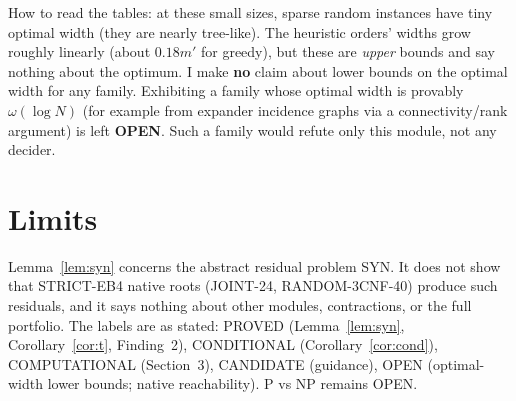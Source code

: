 \documentclass[11pt]{article}
\theoremstyle{definition}
\begin{document}
How to read the tables: at these small sizes, sparse random instances have tiny optimal width (they are nearly tree-like). The heuristic orders' widths grow roughly linearly (about $0.18m'$ for greedy), but these are \emph{upper} bounds and say nothing about the optimum. I make \textbf{no} claim about lower bounds on the optimal width for any family. Exhibiting a family whose optimal width is provably $\omega(\log N)$ (for example from expander incidence graphs via a connectivity/rank argument) is left \textbf{OPEN}. Such a family would refute only this module, not any decider.

\section{Limits}
Lemma~\ref{lem:syn} concerns the abstract residual problem SYN. It does not show that STRICT-EB4 native roots (JOINT-24, RANDOM-3CNF-40) produce such residuals, and it says nothing about other modules, contractions, or the full portfolio. The labels are as stated: PROVED (Lemma~\ref{lem:syn}, Corollary~\ref{cor:t}, Finding~2), CONDITIONAL (Corollary~\ref{cor:cond}), COMPUTATIONAL (Section~3), CANDIDATE (guidance), OPEN (optimal-width lower bounds; native reachability). P vs NP remains OPEN.
\end{document}
